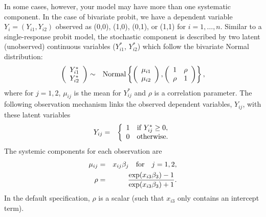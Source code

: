 \documentclass[letterpaper,10pt,english]{sphinxmanual}
\begin{document}
In some cases, however, your model may have more than one systematic
component. In the case of bivariate probit, we have a dependent variable
\(Y_i = (Y_{i1}, Y_{i2})\) observed as (0,0), (1,0), (0,1), or (1,1)
for \(i = 1, \dots, n\). Similar to a single-response probit model,
the stochastic component is described by two latent (unobserved)
continuous variables (\(Y_{i1}^*\), \(Y_{i2}^*\)) which follow
the bivariate Normal distribution:
\begin{gather}
\begin{split}\begin{aligned}
  \left ( \begin{array}{c}
      Y_{i1}^* \\
      Y_{i2}^*
    \end{array}
  \right ) &\sim &
  \textrm{Normal} \left \{ \left (
      \begin{array}{c}
        \mu_{i1} \\ \mu_{i2}
      \end{array} \right ), \left( \begin{array}{cc}
                 1 & \rho \\
                 \rho & 1
                 \end{array} \right) \right\},\end{aligned}\end{split}\notag
\end{gather}
where for \(j = 1, 2\), \(\mu_{ij}\) is the mean for
\(Y_{ij}^*\) and \(\rho\) is a correlation parameter. The
following observation mechanism links the observed dependent variables,
\(Y_{ij}\), with these latent variables
\begin{gather}
\begin{split}\begin{aligned}
Y_{ij} & = & \left \{ \begin{array}{cc}
                   1 & {\rm if} \; Y_{ij}^* \ge 0, \\
                   0 & {\rm otherwise.}
                   \end{array}
                   \right.\end{aligned}\end{split}\notag
\end{gather}
The systemic components for each observation are
\begin{gather}
\begin{split}\begin{aligned}
    \mu_{ij} & = & x_{ij} \beta_j \quad {\rm for} \quad j = 1, 2, \\
    \rho & = & \frac{\exp(x_{i3} \beta_3) - 1}{\exp(x_{i3} \beta_3) + 1}.\end{aligned}\end{split}\notag
\end{gather}
In the default specification, \(\rho\) is a scalar (such that
\(x_{i3}\) only contains an intercept term).
\end{document}
